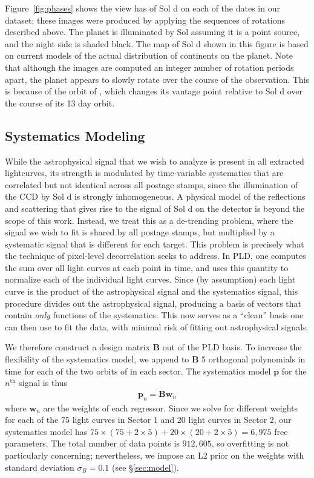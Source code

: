\documentclass[modern]{aastex62}
\begin{document}
Figure~\ref{fig:phases} shows the view \tess has of Sol d on each of the dates
in our dataset; these images were produced by applying the sequences of rotations
described above. The planet is illuminated by Sol assuming it is a point source,
and the night side is shaded black. The map of Sol d shown in this figure is 
based on current models of the actual distribution of continents on the planet.
Note that although the images are computed an integer number of rotation periods
apart, the planet appears to slowly rotate over the course of the observation.
This is because of the orbit of \tess, which changes its vantage point relative
to Sol d over the course of its 13 day orbit.

\subsection{Systematics Modeling}
\label{sec:systematics}

While the astrophysical signal that we wish to analyze is present in all 
extracted lightcurves, its strength is modulated by time-variable systematics 
that are correlated but not identical across all postage stamps, since the
illumination of the CCD by Sol d is strongly inhomogeneous. A physical
model of the reflections and scattering that gives rise to the
signal of Sol d on the \tess detector is beyond the scope of this work. Instead,
we treat this as a de-trending problem, where the signal we wish to fit is
shared by all postage stamps, but multiplied by a systematic signal that is
different for each target. This problem is precisely what the technique of
pixel-level decorrelation \citep[PLD;][]{Deming2015, Luger2016, Luger2018a}
seeks to address. In PLD, one computes the sum over all light curves at each
point in time, and uses this quantity to normalize each of the individual
light curves. Since (by assumption) each light curve is the product of the astrophysical
signal and the systematics signal, this procedure divides out the astrophysical
signal, producing a basis of vectors that contain \emph{only} functions of the
systematics. This now serves as a ``clean'' basis one can then use to fit the
data, with minimal risk of fitting out astrophysical signals.

We therefore construct a design matrix $\mathbf{B}$ out of the PLD basis. To
increase the flexibility of the systematics model, we append to $\mathbf{B}$ 5 orthogonal
polynomials in time for each of the two orbits of \tess in each sector.
The systematics model $\mathbf{p}$ for the $n^\mathrm{th}$ signal is thus
%
\begin{align}
\mathbf{p}_n = \mathbf{B} \mathbf{w}_n
\end{align}
%
where $\mathbf{w}_n$ are the weights of each regressor.
Since we solve for different weights for each of the 75 light curves in Sector 1
and 20 light curves in Sector 2, our systematics model has
$75 \times (75 + 2 \times 5) + 20 \times (20 + 2 \times 5) = 6,975$ free parameters.
The total number of data points is $912,605$, so overfitting is not particularly
concerning; nevertheless, we impose an L2 prior on the weights with
standard deviation $\sigma_B = 0.1$ (see \S\ref{sec:model}).
\end{document}
